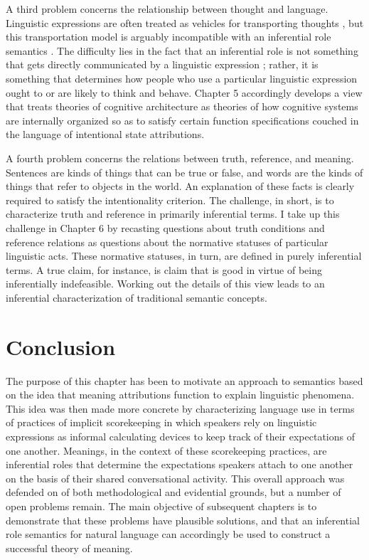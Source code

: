 A third problem concerns the relationship between thought and language. Linguistic expressions are often treated as vehicles for transporting thoughts \citep{Brandom:1994,KortaPerry:2015,Fodor:1998}, but this transportation model is arguably incompatible with an inferential role semantics \citep{Brandom:2010,Brandom:1994}. The difficulty lies in the fact that an inferential role is not something that gets directly communicated by a linguistic expression \citep{Brandom:2010,Brandom:1994}; rather, it is something that determines how people who use a particular linguistic expression ought to or are likely to think and behave. Chapter 5 accordingly develops a view that treats theories of cognitive architecture as theories of how cognitive systems are internally organized so as to satisfy certain function specifications couched in the language of intentional state attributions. 

A fourth problem concerns the relations between truth, reference, and meaning. Sentences are kinds of things that can be true or false, and words are the kinds of things that refer to objects in the world. An explanation of these facts is clearly required to satisfy the intentionality criterion. The challenge, in short, is to characterize truth and reference in primarily inferential terms. I take up this challenge in Chapter 6 by recasting questions about truth conditions and reference relations as questions about the normative statuses of particular linguistic acts. These normative statuses, in turn, are defined in purely inferential terms. A true claim, for instance, is claim that is good in virtue of being inferentially indefeasible. Working out the details of this view leads to an inferential characterization of traditional semantic concepts.

\section{Conclusion}

The purpose of this chapter has been to motivate an approach to semantics based on the idea that meaning attributions function to explain linguistic phenomena. This idea was then made more concrete by characterizing language use in terms of practices of implicit scorekeeping in which speakers rely on linguistic expressions as informal calculating devices to keep track of their expectations of one another. Meanings, in the context of these scorekeeping practices, are inferential roles that determine the expectations speakers attach to one another on the basis of their shared conversational activity. This overall approach was defended on of both methodological and evidential grounds, but a number of open problems remain. The main objective of subsequent chapters is to demonstrate that these problems have plausible solutions, and that an inferential role semantics for natural language can accordingly be used to construct a successful theory of meaning.
